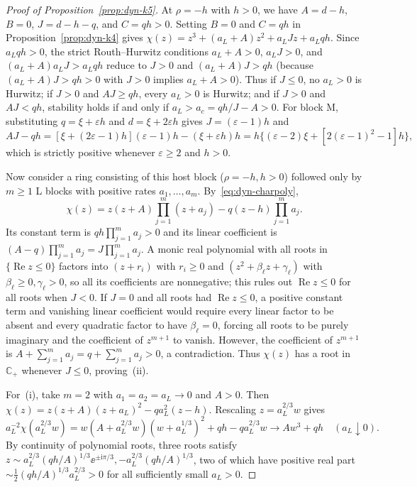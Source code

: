 \begin{proof}[Proof of Proposition~{\upshape\ref{prop:dyn-k5}}]
At $\rho = -h$ with $h > 0$, we have $A = d - h$, $B = 0$, $J = d - h - q$, and $C = qh > 0$. Setting $B = 0$ and $C = qh$ in Proposition~\ref{prop:dyn-k4} gives $\chi(z) = z^3 + (a_L + A)z^2 + a_L J z + a_L qh$. Since $a_L qh > 0$, the strict Routh--Hurwitz conditions $a_L + A > 0$, $a_L J > 0$, and $(a_L + A)a_L J > a_L qh$ reduce to $J > 0$ and $(a_L + A)J > qh$ (because $(a_L + A)J > qh > 0$ with $J > 0$ implies $a_L + A > 0$). Thus if $J \le 0$, no $a_L > 0$ is Hurwitz; if $J > 0$ and $AJ \ge qh$, every $a_L > 0$ is Hurwitz; and if $J > 0$ and $AJ < qh$, stability holds if and only if $a_L > a_c = qh/J - A > 0$. For block M, substituting $q = \xi + \varepsilon h$ and $d = \xi + 2\varepsilon h$ gives $J = (\varepsilon - 1)h$ and
\[
AJ - qh = [\xi + (2\varepsilon - 1)h](\varepsilon - 1)h - (\xi + \varepsilon h)h = h\bigl\{(\varepsilon - 2)\xi + [2(\varepsilon - 1)^2 - 1]h\bigr\},
\]
which is strictly positive whenever $\varepsilon \ge 2$ and $h > 0$.

Now consider a ring consisting of this host block ($\rho = -h, h > 0$) followed only by $m \ge 1$ L blocks with positive rates $a_1, \dots, a_m$. By~\eqref{eq:dyn-charpoly},
\[
\chi(z) = z(z + A)\prod_{j=1}^m (z + a_j) - q(z - h)\prod_{j=1}^m a_j.
\]
Its constant term is $qh\prod_{j=1}^m a_j > 0$ and its linear coefficient is $(A - q)\prod_{j=1}^m a_j = J\prod_{j=1}^m a_j$. A monic real polynomial with all roots in $\{\operatorname{Re} z \le 0\}$ factors into $(z + r_i)$ with $r_i \ge 0$ and $(z^2 + \beta_\ell z + \gamma_\ell)$ with $\beta_\ell \ge 0, \gamma_\ell > 0$, so all its coefficients are nonnegative; this rules out $\operatorname{Re} z \le 0$ for all roots when $J < 0$. If $J = 0$ and all roots had $\operatorname{Re} z \le 0$, a positive constant term and vanishing linear coefficient would require every linear factor to be absent and every quadratic factor to have $\beta_\ell = 0$, forcing all roots to be purely imaginary and the coefficient of $z^{m+1}$ to vanish. However, the coefficient of $z^{m+1}$ is $A + \sum_{j=1}^m a_j = q + \sum_{j=1}^m a_j > 0$, a contradiction. Thus $\chi(z)$ has a root in $\mathbb{C}_+$ whenever $J \le 0$, proving~(ii).

For~(i), take $m = 2$ with $a_1 = a_2 = a_L \to 0$ and $A > 0$. Then $\chi(z) = z(z + A)(z + a_L)^2 - qa_L^2(z - h)$. Rescaling $z = a_L^{2/3} w$ gives
\[
a_L^{-2}\chi(a_L^{2/3}w) = w(A + a_L^{2/3}w)(w + a_L^{1/3})^2 + qh - qa_L^{2/3}w \longrightarrow Aw^3 + qh \quad (a_L \downarrow 0).
\]
By continuity of polynomial roots, three roots satisfy $z \sim a_L^{2/3}(qh/A)^{1/3}\ee^{\pm \mathrm{i}\pi/3}, -a_L^{2/3}(qh/A)^{1/3}$, two of which have positive real part $\sim \frac{1}{2}(qh/A)^{1/3}a_L^{2/3} > 0$ for all sufficiently small $a_L > 0$.


\end{proof}
